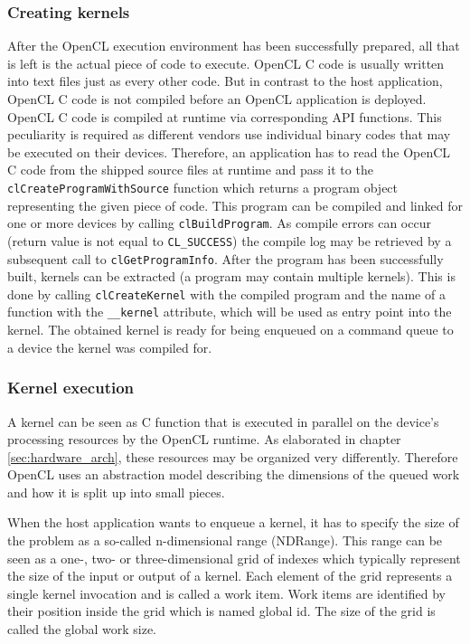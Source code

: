 \subsubsection{Creating kernels}
After the OpenCL execution environment has been successfully prepared, all that is left is the actual piece of code to execute. OpenCL C code is usually written into text files just as every other code. But in contrast to the host application, OpenCL C code is not compiled before an OpenCL application is deployed. OpenCL C code is compiled at runtime via corresponding API functions. This peculiarity is required as different vendors use individual binary codes that may be executed on their devices.
Therefore, an application has to read the OpenCL C code from the shipped source files at runtime and pass it to the \lstinline!clCreateProgramWithSource! function which returns a program object representing the given piece of code. This program can be compiled and linked for one or more devices by calling \lstinline!clBuildProgram!. As compile errors can occur (return value is not equal to \lstinline!CL_SUCCESS!) the compile log may be retrieved by a subsequent call to \lstinline!clGetProgramInfo!. After the program has been successfully built, kernels can be extracted (a program may contain multiple kernels). This is done by calling \lstinline!clCreateKernel! with the compiled program and the name of a function with the \lstinline!__kernel! attribute, which will be used as entry point into the kernel. The obtained kernel is ready for being enqueued on a command queue to a device the kernel was compiled for. \cite[p.26, 27]{opencl_book}

\subsubsection{Kernel execution}
\label{sec:kernel_execcution}
A kernel can be seen as C function that is executed in parallel on the device's processing resources by the OpenCL runtime. As elaborated in chapter \ref{sec:hardware_arch}, these resources may be organized very differently. Therefore OpenCL uses an abstraction model describing the dimensions of the queued work and how it is split up into small pieces. \cite[p.16]{opencl_book}

When the host application wants to enqueue a kernel, it has to specify the size of the problem as a so-called n-dimensional range (NDRange). This range can be seen as a one-, two- or three-dimensional grid of indexes which typically represent the size of the input or output of a kernel. Each element of the grid represents a single kernel invocation and is called a work item. Work items are identified by their position inside the grid which is named global id. The size of the grid is called the global work size. \cite[p.18]{opencl_book}

